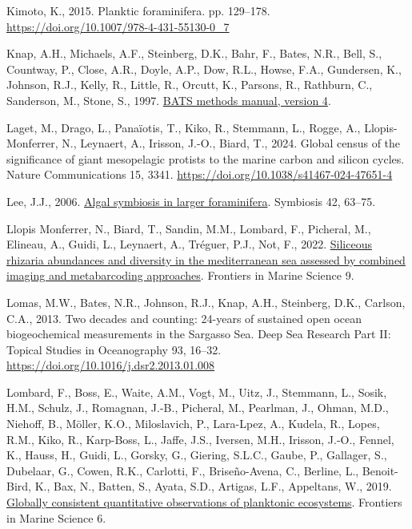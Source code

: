 \documentclass[
]{article}
\newlength{\cslhangindent}
\newenvironment{CSLReferences}[2] %
 {\begin{list}{}{%
  \setlength{\itemindent}{0pt}
  \setlength{\leftmargin}{0pt}
  \setlength{\parsep}{0pt}
  \ifodd #1
   \setlength{\leftmargin}{\cslhangindent}
   \setlength{\itemindent}{-1\cslhangindent}
  \fi
  \setlength{\itemsep}{#2\baselineskip}}}
 {\end{list}}
\begin{document}
\begin{CSLReferences}{1}{0}
Kimoto, K., 2015. Planktic foraminifera. pp. 129--178.
\url{https://doi.org/10.1007/978-4-431-55130-0_7}

Knap, A.H., Michaels, A.F., Steinberg, D.K., Bahr, F., Bates, N.R.,
Bell, S., Countway, P., Close, A.R., Doyle, A.P., Dow, R.L., Howse,
F.A., Gundersen, K., Johnson, R.J., Kelly, R., Little, R., Orcutt, K.,
Parsons, R., Rathburn, C., Sanderson, M., Stone, S., 1997.
\href{https://eprints.soton.ac.uk/361194/}{BATS methods manual, version
4}.

Laget, M., Drago, L., Panaïotis, T., Kiko, R., Stemmann, L., Rogge, A.,
Llopis-Monferrer, N., Leynaert, A., Irisson, J.-O., Biard, T., 2024.
Global census of the significance of giant mesopelagic protists to the
marine carbon and silicon cycles. Nature Communications 15, 3341.
\url{https://doi.org/10.1038/s41467-024-47651-4}

Lee, J.J., 2006.
\href{https://dalspace.library.dal.ca/bitstream/handle/10222/78255/VOLUME\%2042-NUMBER\%202-2006-PAGE\%2063.pdf?sequence=1}{Algal
symbiosis in larger foraminifera}. Symbiosis 42, 63--75.

Llopis Monferrer, N., Biard, T., Sandin, M.M., Lombard, F., Picheral,
M., Elineau, A., Guidi, L., Leynaert, A., Tréguer, P.J., Not, F., 2022.
\href{https://www.frontiersin.org/articles/10.3389/fmars.2022.895995}{Siliceous
rhizaria abundances and diversity in the mediterranean sea assessed by
combined imaging and metabarcoding approaches}. Frontiers in Marine
Science 9.

Lomas, M.W., Bates, N.R., Johnson, R.J., Knap, A.H., Steinberg, D.K.,
Carlson, C.A., 2013. Two decades and counting: 24-years of sustained
open ocean biogeochemical measurements in the Sargasso Sea. Deep Sea
Research Part II: Topical Studies in Oceanography 93, 16--32.
\url{https://doi.org/10.1016/j.dsr2.2013.01.008}

Lombard, F., Boss, E., Waite, A.M., Vogt, M., Uitz, J., Stemmann, L.,
Sosik, H.M., Schulz, J., Romagnan, J.-B., Picheral, M., Pearlman, J.,
Ohman, M.D., Niehoff, B., Möller, K.O., Miloslavich, P., Lara-Lpez, A.,
Kudela, R., Lopes, R.M., Kiko, R., Karp-Boss, L., Jaffe, J.S., Iversen,
M.H., Irisson, J.-O., Fennel, K., Hauss, H., Guidi, L., Gorsky, G.,
Giering, S.L.C., Gaube, P., Gallager, S., Dubelaar, G., Cowen, R.K.,
Carlotti, F., Briseño-Avena, C., Berline, L., Benoit-Bird, K., Bax, N.,
Batten, S., Ayata, S.D., Artigas, L.F., Appeltans, W., 2019.
\href{https://www.frontiersin.org/articles/10.3389/fmars.2019.00196}{Globally
consistent quantitative observations of planktonic ecosystems}.
Frontiers in Marine Science 6.


\end{CSLReferences}
\end{document}
